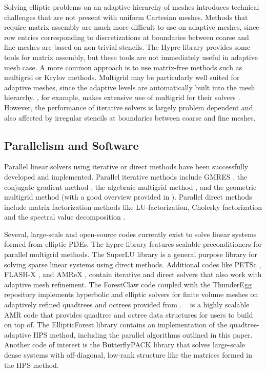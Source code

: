 Solving elliptic problems on an adaptive hierarchy of meshes introduces technical challenges that are not present with uniform Cartesian meshes. Methods that require matrix assembly are much more difficult to use on adaptive meshes, since row entries corresponding to discretizations at boundaries between coarse and fine meshes are based on non-trivial stencils.  The Hypre library \cite{falgout2002hypre} provides some tools for matrix assembly, but these tools are not immediately useful in adaptive mesh case. A more common approach is to use matrix-free methods such as multigrid or Krylov methods.  Multigrid may be particularly well suited for adaptive meshes, since the adaptive levels are automatically built into the mesh hierarchy.  \amrex, for example, makes extensive use of multigrid for their solvers \cite{zhang2019amrex}.  However, the performance of iterative solvers is largely problem dependent and also affected by irregular stencils at boundaries between coarse and fine meshes.

\subsection{Parallelism and Software}

Parallel linear solvers using iterative or direct methods have been successfully developed and implemented. Parallel iterative methods include GMRES \cite{saad1986gmres}, the conjugate gradient method \cite{hestenes1952methods}, the algebraic multigrid method \cite{yang2002boomeramg}, and the geometric multigrid method \cite{sundar2012parallel} (with a good overview provided in \cite{chow2006survey}). Parallel direct methods include matrix factorization methods like LU-factorization, Cholesky factorization and the spectral value decomposition \cite{donfack2015survey, demmel1999asynchronous, gupta1997highly}.

Several, large-scale and open-source codes currently exist to solve linear systems formed from elliptic PDEs. The hypre library \cite{falgout2002hypre} features scalable preconditioners for parallel multigrid methods. The SuperLU library \cite{li2005superlu} is a general purpose library for solving sparse linear systems using direct methods. Additional codes like PETSc \cite{anl2023petsc}, FLASH-X \cite{dubey2022flash}, and AMReX \cite{zhang2019amrex}, contain iterative and direct solvers that also work with adaptive mesh refinement. The ForestClaw code \cite{calhoun2017forestclaw} coupled with the ThunderEgg repository \cite{aiton2022thunderegg} implements hyperbolic and elliptic solvers for finite volume meshes on adaptively refined quadtrees and octrees provided from \pforest. \pforest\ \cite{burstedde2011p4est,burstedde2020parallel} is a highly scalable AMR code that provides quadtree and octree data structures for users to build on top of. The EllipticForest library \cite{chipman2024ellipticforest} contains an implementation of the quadtree-adaptive HPS method, including the parallel algorithms outlined in this paper. Another code of interest is the ButterflyPACK library \cite{liu2018butterflypack} that solves large-scale dense systems with off-diagonal, low-rank structure like the matrices formed in the HPS method.